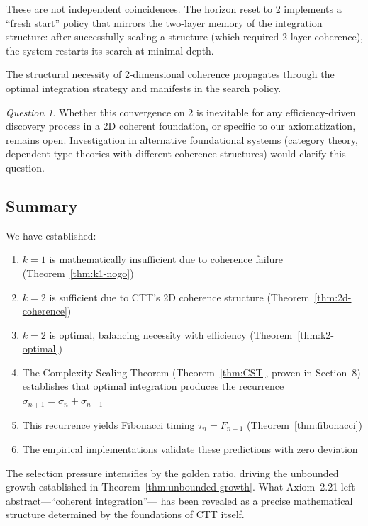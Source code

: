 \documentclass[11pt]{article}
\theoremstyle{definition}
\theoremstyle{remark}
\newtheorem{question}[theorem]{Question}
\begin{document}
These are not independent coincidences. The horizon reset to 2 implements a ``fresh start'' policy
that mirrors the two-layer memory of the integration structure: after successfully sealing a structure
(which required 2-layer coherence), the system restarts its search at minimal depth.

The structural necessity of 2-dimensional coherence propagates through the optimal integration
strategy and manifests in the search policy.

\begin{question}
Whether this convergence on 2 is inevitable for any efficiency-driven discovery process in a 2D
coherent foundation, or specific to our axiomatization, remains open. Investigation in alternative
foundational systems (category theory, dependent type theories with different coherence structures)
would clarify this question.
\end{question}

\subsection{Summary}

We have established:
\begin{enumerate}
\item $k = 1$ is mathematically insufficient due to coherence failure (Theorem~\ref{thm:k1-nogo})
\item $k = 2$ is sufficient due to CTT's 2D coherence structure (Theorem~\ref{thm:2d-coherence})
\item $k = 2$ is optimal, balancing necessity with efficiency (Theorem~\ref{thm:k2-optimal})
\item The Complexity Scaling Theorem (Theorem~\ref{thm:CST}, proven in Section~8) establishes
that optimal integration produces the recurrence $\sigma_{n+1} = \sigma_n + \sigma_{n-1}$
\item This recurrence yields Fibonacci timing $\tau_n = F_{n+1}$ (Theorem~\ref{thm:fibonacci})
\item The empirical implementations validate these predictions with zero deviation
\end{enumerate}

The selection pressure intensifies by the golden ratio, driving the unbounded growth established
in Theorem~\ref{thm:unbounded-growth}. What Axiom~2.21 left abstract---``coherent integration''---
has been revealed as a precise mathematical structure determined by the foundations of CTT itself.
\end{document}
